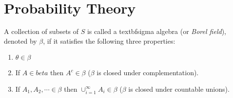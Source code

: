 \section*{Probability Theory}

\begin{definition}
	A collection of subsets of $S$ is called a textbf{sigma algebra} (or \textit{Borel field}), denoted by $\beta$, if it satisfies the following three properties:
	\begin{enumerate}
		\item $\theta \in \beta$ 
		\item If $A \in beta$ then $A^c \in \beta$ ($\beta$ is closed under complementation).
		\item If $A_1, A_2, \cdots \in \beta$ then $\cup_{i=1}^{\infty} A_i \in \beta$ ($\beta$ is closed under countable unions).
	\end{enumerate}
\end{definition}
